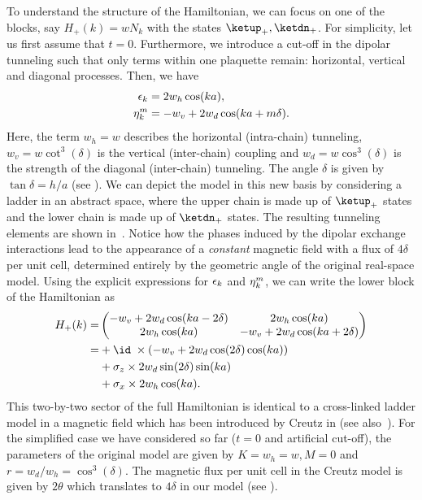 
To understand the structure of the Hamiltonian, we can focus on one of the blocks, say $H_+(k) = w N_k$ with the states $\ketup_+, \ketdn_+$.
For simplicity, let us first assume that $t=0$.
Furthermore, we introduce a cut-off in the dipolar tunneling such that only terms within one plaquette remain: horizontal, vertical and diagonal processes.
Then, we have
\begin{align}
    \operatorname{\epsilon}_k &= 2 w_h \cos(ka), \\
    \eta_k^m &= -w_v + 2 w_d \cos(ka + m\delta).
\end{align}
Here, the term $w_h = w$ describes the horizontal (intra-chain) tunneling, $w_v = w \cot^3(\delta)$ is the vertical (inter-chain) coupling and $w_d = w \cos^3(\delta)$ is the strength of the diagonal (inter-chain) tunneling.
The angle $\delta$ is given by $\tan \delta = h/a$ (see ).
We can depict the model in this new basis by considering a ladder in an abstract space, where the upper chain is made up of $\ketup_+$ states and the lower chain is made up of $\ketdn_+$ states.
The resulting tunneling elements are shown in~.
Notice how the phases induced by the dipolar exchange interactions lead to the appearance of a \emph{constant} magnetic field with a flux of $4\delta$ per unit cell, determined entirely by the geometric angle of the original real-space model.
Using the explicit expressions for $\operatorname{\epsilon}_k$ and $\operatorname{\eta}^m_k$, we can write the lower block of the Hamiltonian as
\begin{align}
    H_+(k) = &\begin{pmatrix}
        -w_v + 2w_d \cos(ka-2\delta) & 2w_h \cos(ka) \\
        2w_h\cos(ka) & -w_v + 2w_d \cos(ka+2\delta)
    \end{pmatrix} \\
    = &+\id \; \times (-w_v + 2w_d \cos(2\delta) \cos(ka)) \\
    &+\sigma_z \times 2w_d \sin(2\delta) \sin(ka) \\
    &+\sigma_x \times 2w_h \cos(ka).
\end{align}
This two-by-two sector of the full Hamiltonian is identical to a cross-linked ladder model in a magnetic field which has been introduced by Creutz in  (see also~\cite{Tovmasyan2013a}).
For the simplified case we have considered so far ($t=0$ and artificial cut-off), the parameters of the original model are given by $K=w_h=w, M=0$ and $r=w_d/w_h=\cos^3(\delta)$.
The magnetic flux per unit cell in the Creutz model is given by $2\theta$ which translates to $4\delta$ in our model (see ).

